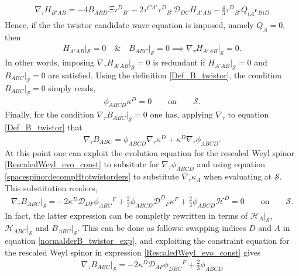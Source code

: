 \documentclass[10pt,a4paper]{article}
\theoremstyle{plain}
\begin{document}
{\begin{align}
\nabla_\tau H_{B'AB} = -4 B_{ABD} \Xi \tau ^{D}{}_{B'} -2 \tau ^{CA'}
\tau ^{D}{}_{B'} \mathcal{D} _{DC}H_{A'AB} - \tfrac{4}{3} \tau
^{D}{}_{B'}Q_{(A}\epsilon _{B)D}
\end{align}
Hence, if the the twistor candidate wave equation is imposed, namely
$Q_A=0$, then
\begin{align}
H_{A'AB}|_{\mathcal{S}}=0\quad \& \quad B_{ABC}|_{\mathcal{S}}=0
\implies \nabla_\tau H_{A'AB}|_{\mathcal{S}}=0.
\end{align}
In other words, imposing $\nabla_\tau H_{A'AB}|_{\mathcal{S}}=0$ is
redundant if $H_{A'AB}|_{\mathcal{S}}=0$ and $
B_{ABC}|_{\mathcal{S}}=0$ are satisfied.  Using the definition
\eqref{Def_B_twistor}, the condition $B_{ABC}|_{\mathcal{S}}=0$ simply
reads,
\begin{align}
  \phi_{ABCD}\kappa^D=0 \qquad \text{on} \qquad \mathcal{S}.
\end{align}
Finally, for the condition $\nabla_{\tau}B_{ABC}|_{\mathcal{S}}=0$ one
has, applying $\nabla_\tau$ to equation \eqref{Def_B_twistor} that
\begin{align}
\nabla_\tau B_{ABC} = \phi _{ABCD}\nabla_\tau \kappa ^{D} + \kappa
^{D} \nabla_\tau \phi _{ABCD} .
\end{align}
At this point one can exploit the evolution equation for the rescaled
Weyl spinor \eqref{RescaledWeyl_evo_const} to subsitute for
$\nabla_\tau \phi_{ABCD}$ and using equation
\eqref {spacespinordecompHtotwistorders}
to substitute $\nabla_\tau \kappa_A$ when evaluating at
$\mathcal{S}$. This substitution renders,
\begin{align}\label{normalderB_twistor_exp}
\nabla_{\tau}B_{ABC}|_{\mathcal{S}}= -2\kappa ^{D} \mathcal{D}
_{DF}\phi _{ABC}{}^{F} + \tfrac{2}{3} \phi _{ABCD} \mathcal{D}
^{D}{}_{F}\kappa ^{F} + \tfrac{2}{3}\phi_{ABCD}\mathcal{H}^D = 0 \qquad \text{on} \qquad \mathcal{S}.
\end{align}
In fact, the latter expression can be completly rewritten in terms of
$\mathcal{H}_A|_{\mathcal{S}}$, $\mathcal{H}_{ABC}|_{\mathcal{S}}$
and $B_{ABC}|_{\mathcal{S}}$. This can be done as follows: swapping indices $D$ and $A$ in equation
\eqref{normalderB_twistor_exp}, and exploiting the constraint equation for the rescaled Weyl spinor in expression
\eqref{RescaledWeyl_evo_const} gives
\begin{align}\label{normalderB_twistor_exp2}
\nabla_{\tau}B_{ABC}|_{\mathcal{S}}= -2 \kappa ^{D} \mathcal{D} _{AF}\phi _{DBC}{}^{F} + \tfrac{2}{3} \phi _{ABCD}

\end{align}}
\end{document}
